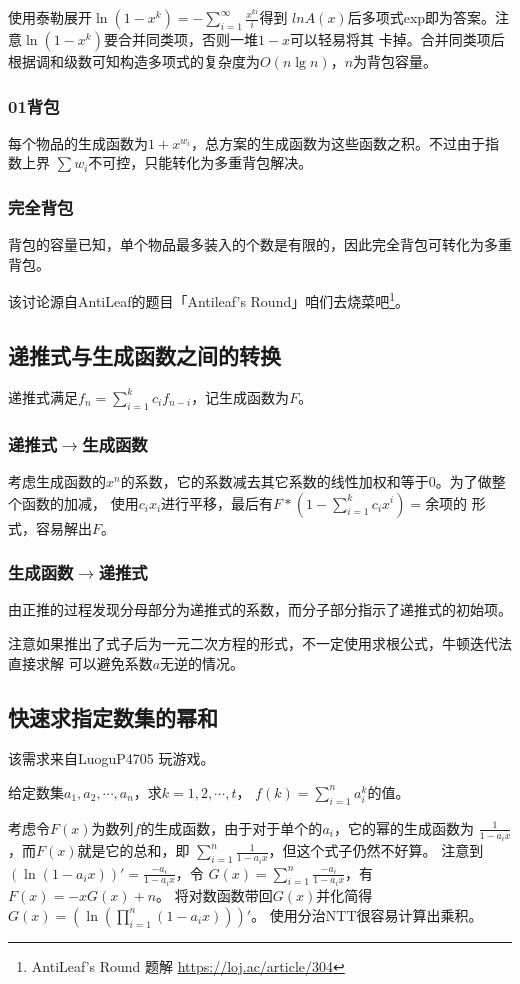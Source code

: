 使用泰勒展开$\displaystyle \ln(1-x^k)=-\sum_{i=1}^\infty{\frac{x^{ki}}{i}}$得到
$ln A(x)$后多项式exp即为答案。注意$\ln (1-x^k)$要合并同类项，否则一堆$1-x$可以轻易将其
卡掉。合并同类项后根据调和级数可知构造多项式的复杂度为$O(n\lg n)$，$n$为背包容量。
\subsubsection{01背包}
每个物品的生成函数为$1+x^{w_i}$，总方案的生成函数为这些函数之积。不过由于指数上界
$\sum{w_i}$不可控，只能转化为多重背包解决。
\subsubsection{完全背包}
背包的容量已知，单个物品最多装入的个数是有限的，因此完全背包可转化为多重背包。

该讨论源自AntiLeaf的题目「Antileaf's Round」咱们去烧菜吧\footnote{
	AntiLeaf's Round 题解
	\url{https://loj.ac/article/304}
}。
\subsection{递推式与生成函数之间的转换}
递推式满足$\displaystyle f_n=\sum_{i=1}^k{c_if_{n-i}}$，记生成函数为$F$。
\subsubsection{递推式$\rightarrow$生成函数}
考虑生成函数的$x^n$的系数，它的系数减去其它系数的线性加权和等于0。为了做整个函数的加减，
使用$c_ix_i$进行平移，最后有$F*(1-\displaystyle \sum_{i=1}^k{c_ix^i})=$余项的
形式，容易解出$F$。
\subsubsection{生成函数$\rightarrow$递推式}
由正推的过程发现分母部分为递推式的系数，而分子部分指示了递推式的初始项。

注意如果推出了式子后为一元二次方程的形式，不一定使用求根公式，牛顿迭代法直接求解
可以避免系数$a$无逆的情况。
\subsection{快速求指定数集的幂和}
该需求来自LuoguP4705 玩游戏。

给定数集$a_1,a_2,\cdots,a_n$，求$k=1,2,\cdots,t$，
$f(k)=\displaystyle \sum_{i=1}^n{a_i^k}$的值。

考虑令$F(x)$为数列$f$的生成函数，由于对于单个的$a_i$，它的幂的生成函数为
$\frac{1}{1-a_ix}$，而$F(x)$就是它的总和，即
$\displaystyle \sum_{i=1}^n{\frac{1}{1-a_ix}}$，但这个式子仍然不好算。
注意到$(\ln (1-a_ix))'=\frac{-a_i}{1-a_ix}$，令
$G(x)=\displaystyle \sum_{i=1}^n{\frac{-a_i}{1-a_ix}}$，有$F(x)=-xG(x)+n$。
将对数函数带回$G(x)$并化简得
$\displaystyle G(x)=\left(\ln\left(\prod_{i=1}^n{(1-a_ix)}\right)\right)'$。
使用分治NTT很容易计算出乘积。
